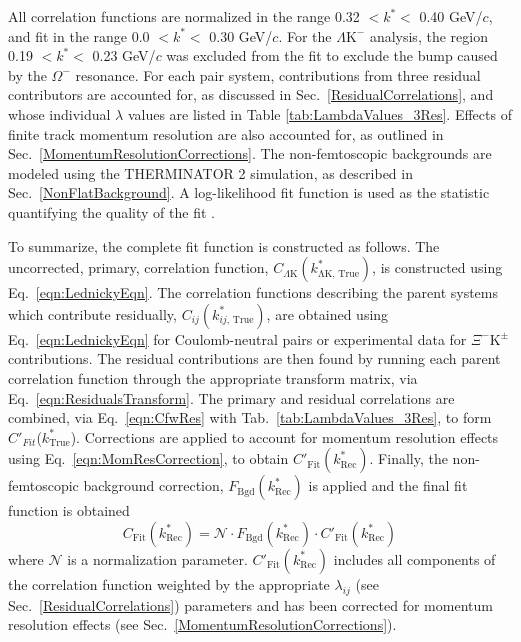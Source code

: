 \documentclass[ALICE,manyauthors]{cernphprep}
\newcommand{\ktrue}{$k^{*}_{\mathrm{True}}$\xspace}
\newcommand{\LamKchM}{$\Lambda\mathrm{K^{-}}$\xspace}
\newcommand{\XiKpm}{$\Xi^{-}\mathrm{K^{\pm}}$\xspace}
\begin{document}
All correlation functions are normalized in the range 0.32 $< k^{*} <$ 0.40 GeV/$c$, and fit in the range 0.0 $< k^{*} <$ 0.30 GeV/$c$.
For the \LamKchM analysis, the region 0.19 $< k^{*} <$ 0.23 GeV/$c$ was excluded from the fit to exclude the bump caused by the $\Omega^{-}$ resonance.
For each pair system, contributions from three residual contributors are accounted for, as discussed in Sec.\ \ref{ResidualCorrelations}, and whose individual $\lambda$ values are listed in Table \ref{tab:LambdaValues_3Res}.
Effects of finite track momentum resolution are also accounted for, as outlined in Sec.\ \ref{MomentumResolutionCorrections}.
The non-femtoscopic backgrounds are modeled using the THERMINATOR 2 simulation, as described in Sec.\ \ref{NonFlatBackground}.
A log-likelihood fit function is used as the statistic quantifying the quality of the fit \cite{Lisa:2005dd}.

To summarize, the complete fit function is constructed as follows.
The uncorrected, primary, correlation function, $C_{\Lambda\mathrm{K}}(k^{*}_{\mathrm{\Lambda K,\,True}})$, is constructed using Eq.\ \ref{eqn:LednickyEqn}.
The correlation functions describing the parent systems which contribute residually, $C_{ij}(k^{*}_{ij,\,\mathrm{True}})$, are obtained using Eq.\ \ref{eqn:LednickyEqn} for Coulomb-neutral pairs or experimental data for \XiKpm contributions.
The residual contributions are then found by running each parent correlation function through the appropriate transform matrix, via Eq.\ \ref{eqn:ResidualsTransform}.
The primary and residual correlations are combined, via Eq.\ \ref{eqn:CfwRes} with Tab.\ \ref{tab:LambdaValues_3Res}, to form $C'_{Fit}$(\ktrue).
Corrections are applied to account for momentum resolution effects using Eq.\ \ref{eqn:MomResCorrection}, to obtain $C'_{\mathrm{Fit}}(k^{*}_{\mathrm{Rec}})$.
Finally, the non-femtoscopic background correction, $F_{\mathrm{Bgd}}(k^{*}_{\mathrm{Rec}})$ is applied and the final fit function is obtained 
\begin{equation}
C_{\mathrm{Fit}}(k^{*}_{\mathrm{Rec}}) = \mathcal{N}\cdot F_{\mathrm{Bgd}}(k^{*}_{\mathrm{Rec}})\cdot C'_{\mathrm{Fit}}(k^{*}_{\mathrm{Rec}})
\end{equation}
where $\mathcal{N}$ is a normalization parameter.
$C'_{\mathrm{Fit}}(k^{*}_{\mathrm{Rec}})$ includes all components of the correlation function weighted by the appropriate $\lambda_{ij}$ (see Sec.\ \ref{ResidualCorrelations}) parameters and has been corrected for momentum resolution effects (see Sec.\ \ref{MomentumResolutionCorrections}).
\end{document}
